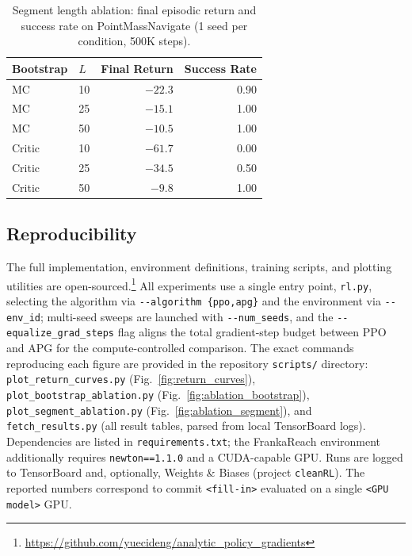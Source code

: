 \documentclass[11pt,a4paper]{article}
\begin{document}
\begin{table}[htbp]
  \centering
  \caption{Segment length ablation: final episodic return and success rate on PointMassNavigate (1 seed per condition, 500K steps).}
  \label{tab:ablation_segment}
  \begin{tabular}{@{}llrr@{}}
    \toprule
    \textbf{Bootstrap} & \textbf{$L$} & \textbf{Final Return} & \textbf{Success Rate} \\
    \midrule
    MC     & 10 & $-22.3$ & 0.90 \\
    MC     & 25 & $-15.1$ & 1.00 \\
    MC     & 50 & $-10.5$ & 1.00 \\
    \midrule
    Critic & 10 & $-61.7$ & 0.00 \\
    Critic & 25 & $-34.5$ & 0.50 \\
    Critic & 50 & $-9.8$  & 1.00 \\
    \bottomrule
  \end{tabular}
\end{table}

\subsection{Reproducibility}
\label{sec:reproducibility}
The full implementation, environment definitions, training scripts, and plotting utilities are open-sourced.\footnote{\url{https://github.com/yuecideng/analytic_policy_gradients}} All experiments use a single entry point, \texttt{rl.py}, selecting the algorithm via \texttt{-{}-algorithm \{ppo,apg\}} and the environment via \texttt{-{}-env\_id}; multi-seed sweeps are launched with \texttt{-{}-num\_seeds}, and the \texttt{-{}-equalize\_grad\_steps} flag aligns the total gradient-step budget between PPO and APG for the compute-controlled comparison. The exact commands reproducing each figure are provided in the repository \texttt{scripts/} directory: \texttt{plot\_return\_curves.py} (Fig.~\ref{fig:return_curves}), \texttt{plot\_bootstrap\_ablation.py} (Fig.~\ref{fig:ablation_bootstrap}), \texttt{plot\_segment\_ablation.py} (Fig.~\ref{fig:ablation_segment}), and \texttt{fetch\_results.py} (all result tables, parsed from local TensorBoard logs). Dependencies are listed in \texttt{requirements.txt}; the FrankaReach environment additionally requires \texttt{newton==1.1.0} and a CUDA-capable GPU. Runs are logged to TensorBoard and, optionally, Weights \& Biases (project \texttt{cleanRL}). The reported numbers correspond to commit \texttt{<fill-in>} evaluated on a single \texttt{<GPU model>} GPU.
\end{document}

